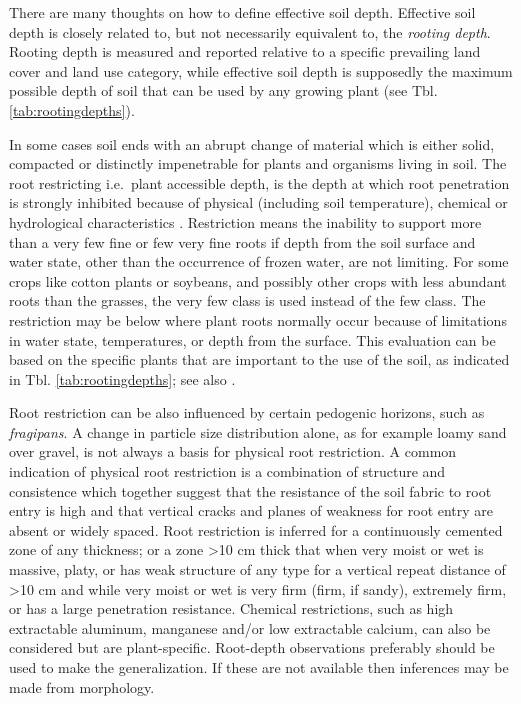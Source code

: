 \documentclass[11pt]{krantz}
\theoremstyle{definition}
\theoremstyle{definition}
\theoremstyle{definition}
\theoremstyle{remark}
\begin{document}
There are many thoughts on how to define effective soil depth. Effective
soil depth is closely related to, but not necessarily equivalent to, the
\emph{rooting depth}. Rooting depth is measured and reported relative to
a specific prevailing land cover and land use category, while effective
soil depth is supposedly the maximum possible depth of soil that can be
used by any growing plant (see Tbl. \ref{tab:rootingdepths}).

In some cases soil ends with an abrupt change of material which is
either solid, compacted or distinctly impenetrable for plants and
organisms living in soil. The root restricting i.e.~plant accessible
depth, is the depth at which root penetration is strongly inhibited
because of physical (including soil temperature), chemical or
hydrological characteristics \citep[ p.60]{SSDS1993}. Restriction means
the inability to support more than a very few fine or few very fine
roots if depth from the soil surface and water state, other than the
occurrence of frozen water, are not limiting. For some crops like cotton
plants or soybeans, and possibly other crops with less abundant roots
than the grasses, the very few class is used instead of the few class.
The restriction may be below where plant roots normally occur because of
limitations in water state, temperatures, or depth from the surface.
This evaluation can be based on the specific plants that are important
to the use of the soil, as indicated in Tbl. \ref{tab:rootingdepths};
see also \citet[p.60]{SSDS1993}.

Root restriction can be also influenced by certain pedogenic horizons,
such as \emph{fragipans}. A change in particle size distribution alone,
as for example loamy sand over gravel, is not always a basis for
physical root restriction. A common indication of physical root
restriction is a combination of structure and consistence which together
suggest that the resistance of the soil fabric to root entry is high and
that vertical cracks and planes of weakness for root entry are absent or
widely spaced. Root restriction is inferred for a continuously cemented
zone of any thickness; or a zone \textgreater{}10 cm thick that when
very moist or wet is massive, platy, or has weak structure of any type
for a vertical repeat distance of \textgreater{}10 cm and while very
moist or wet is very firm (firm, if sandy), extremely firm, or has a
large penetration resistance. Chemical restrictions, such as high
extractable aluminum, manganese and/or low extractable calcium, can also
be considered but are plant-specific. Root-depth observations preferably
should be used to make the generalization. If these are not available
then inferences may be made from morphology.
\end{document}
